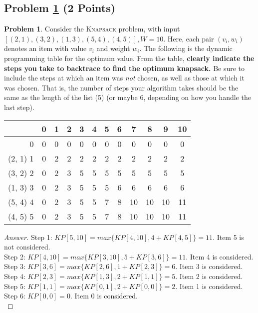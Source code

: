 \documentclass[11pt]{article}
\theoremstyle{definition}
\theoremstyle{definition}
\newtheorem{required}{Problem}
\theoremstyle{definition}
\begin{document}
\subsection{Problem \ref{DP1} (2 Points)}
\begin{required} \label{DP1}
Consider the \textsc{Knapsack} problem, with input $[ (2, 1), (3, 2), (1, 3), (5, 4),(4, 5)], W=10$. Here, each pair $(v_i, w_i)$ denotes an item with value $v_i$ and weight $w_i$. The following is the dynamic programming table for the optimum value. From the table, \textbf{clearly indicate the steps you take to backtrace to find the optimum knapsack.} Be sure to include the steps at which an item was \emph{not} chosen, as well as those at which it was chosen. That is, the number of steps your algorithm takes should be the same as the length of the list (5) (or maybe 6, depending on how you handle the last step). 


\begin{tabular}{|r|c|c|c|c|c|c|c|c|c|c|c|}
\hline
         & 0 & 1 & 2 & 3 & 4 & 5 & 6 & 7 & 8 & 9 &10\\ \hline
       0 & 0 & 0 & 0 & 0 & 0 & 0 & 0 & 0 & 0 & 0 & 0 \\ \hline
(2, 1) 1 & 0 & 2 & 2 & 2 & 2 & 2 & 2 & 2 & 2 & 2 & 2\\ \hline
(3, 2) 2 & 0 & 2 & 3 & 5 & 5 & 5 & 5 & 5 & 5 & 5 & 5\\ \hline
(1, 3) 3 & 0 & 2 & 3 & 5 & 5 & 5 & 6 & 6 & 6 & 6 & 6\\ \hline
(5, 4) 4 & 0 & 2 & 3 & 5 & 5 & 7 & 8 & 10& 10& 10& 11\\ \hline
(4, 5) 5 & 0 & 2 & 3 & 5 & 5 & 7 & 8 & 10& 10& 10& 11\\ \hline
\end{tabular}

\end{required}

\begin{proof}[Answer]
Step 1: $KP[5, 10] = max\{KP[4 , 10], 4 + KP[4, 5]\} = 11$. Item 5 is not considered.\\

Step 2: $KP[4, 10] = max\{KP[3 , 10], 5 + KP[3, 6]\} = 11$. Item 4 is considered.\\

Step 3: $KP[3, 6] = max\{KP[2 , 6], 1 + KP[2, 3]\} = 6$. Item 3 is considered.\\

Step 4: $KP[2, 3] = max\{KP[1 , 3], 2 + KP[1, 1]\} = 5$. Item 2 is considered.\\

Step 5: $KP[1, 1] = max\{KP[0 , 1], 2 + KP[0, 0]\} = 2$. Item 1 is considered.\\

Step 6: $KP[0, 0] = 0$. Item 0 is considered.\\
\end{proof}
\newpage
\end{document}
